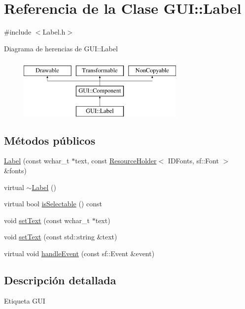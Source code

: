 \hypertarget{classGUI_1_1Label}{}\section{Referencia de la Clase G\+U\+I\+:\+:Label}
\label{classGUI_1_1Label}


{\ttfamily \#include $<$Label.\+h$>$}

Diagrama de herencias de G\+U\+I\+:\+:Label\begin{figure}[H]
\begin{center}
\leavevmode
\includegraphics[height=3.000000cm]{classGUI_1_1Label}
\end{center}
\end{figure}
\subsection*{Métodos públicos}
\begin{DoxyCompactItemize}
\item 
\hyperlink{classGUI_1_1Label_afe779498111491b90a7f3a19eca9811c}{Label} (const wchar\+\_\+t $\ast$text, const \hyperlink{classResourceHolder}{Resource\+Holder}$<$ I\+D\+Fonts, sf\+::\+Font $>$ \&fonts)
\item 
virtual \hyperlink{classGUI_1_1Label_a343799d4193eb813ef561d3a479c1edd}{$\sim$\+Label} ()
\item 
virtual bool \hyperlink{classGUI_1_1Label_a4bf3538b1d2ffa440c184ad59d9b9d76}{is\+Selectable} () const 
\item 
void \hyperlink{classGUI_1_1Label_a5d274e6f5ab69563be24c71207c64ab9}{set\+Text} (const wchar\+\_\+t $\ast$text)
\item 
void \hyperlink{classGUI_1_1Label_ab86467acdbe18a9fda4712a177e16dae}{set\+Text} (const std\+::string \&text)
\item 
virtual void \hyperlink{classGUI_1_1Label_ade8d6fc5a2f56198764ee0ee0f216068}{handle\+Event} (const sf\+::\+Event \&event)
\end{DoxyCompactItemize}


\subsection{Descripción detallada}
Etiqueta G\+U\+I 

